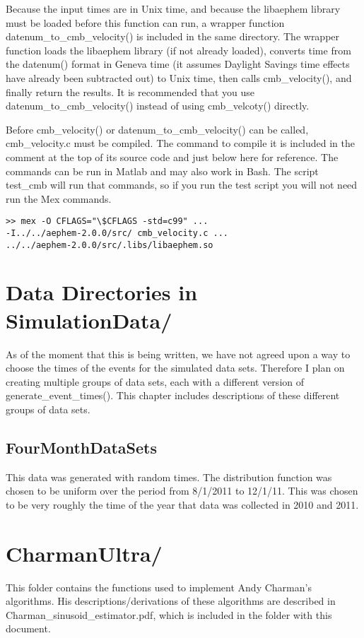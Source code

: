 \documentclass[12pt]{report}
\begin{document}
Because the input times are in Unix time, and because the libaephem library must be loaded before this function can run, a wrapper function datenum\_to\_cmb\_velocity() is included in the same directory.  The wrapper function loads the libaephem library (if not already loaded), converts time from the datenum() format in Geneva time (it assumes Daylight Savings time effects have already been subtracted out) to Unix time, then calls cmb\_velocity(), and finally return the results.  It is recommended that you use datenum\_to\_cmb\_velocity() instead of using cmb\_velcoty() directly.

Before cmb\_velocity() or datenum\_to\_cmb\_velocity() can be called, cmb\_velocity.c must be compiled.  The command to compile it is included in the comment at the top of its source code and just below here for reference.  The commands can be run in Matlab and may also work in Bash.  The script test\_cmb will run that commands, so if you run the test script you will not need run the Mex commands.

\begin{verbatim}
>> mex -O CFLAGS="\$CFLAGS -std=c99" ...
-I../../aephem-2.0.0/src/ cmb_velocity.c ...
../../aephem-2.0.0/src/.libs/libaephem.so
\end{verbatim}





\chapter{Data Directories in SimulationData/}
\label{chap:data_directories}
As of the moment that this is being written, we have not agreed upon a way to choose the times of the events for the simulated data sets.  Therefore I plan on creating multiple groups of data sets, each with a different version of generate\_event\_times().  This chapter includes descriptions of these different groups of data sets.

\section{FourMonthDataSets}
This data was generated with random times.  The distribution function was chosen to be uniform over the period from 8/1/2011 to 12/1/11.  This was chosen to be very roughly the time of the year that data was collected in 2010 and 2011.





\chapter{CharmanUltra/}
This folder contains the functions used to implement Andy Charman's algorithms.  His descriptions/derivations of these algorithms are described in Charman\_sinusoid\_estimator.pdf, which is included in the folder with this document.
\end{document}
